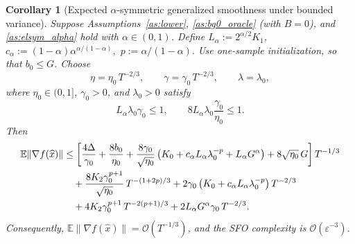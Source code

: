 \documentclass[letter,11pt]{article}
\newtheorem{corollary}{Corollary}[theorem]
\newcommand{\E}{\mathbb{E}}
\newcommand{\Ocal}{\mathcal{O}}
\begin{document}
\begin{corollary}[Expected $\alpha$-symmetric generalized smoothness under bounded variance]
\label{cor:app_nstorm_alpha_bv}
Suppose Assumptions~\ref{as:lower}, \ref{as:bg0_oracle} (with $B=0$), and
\ref{as:elsym_alpha} hold with $\alpha\in(0,1)$. Define
$L_\alpha:=2^{\alpha/2}K_1$, $c_\alpha:=(1-\alpha)\alpha^{\alpha/(1-\alpha)},$ $p:=\alpha/(1-\alpha).$
Use one-sample initialization, so that $b_0\le G$. Choose
\[
    \eta = \eta_0\,T^{-2/3},
    \qquad
    \gamma = \gamma_0\,T^{-2/3},
    \qquad
    \lambda = \lambda_0,
\]
where $\eta_0\in(0,1]$, $\gamma_0>0$, and $\lambda_0>0$ satisfy
\[
    L_\alpha\lambda_0\gamma_0\le1,
    \qquad
    8L_\alpha\lambda_0\frac{\gamma_0}{\eta_0}\le1.
\]
Then
\begin{align}
    \E\|\nabla f(\widehat x)\|
    &\le
    \left[
        \frac{4\Delta}{\gamma_0}
        + \frac{8b_0}{\eta_0}
        + \frac{8\gamma_0}{\sqrt{\eta_0}}
        \left(
            K_0 + c_\alpha L_\alpha\lambda_0^{-p} + L_\alpha G^\alpha
        \right)
        + 8\sqrt{\eta_0}\,G
    \right] T^{-1/3}
    \notag\\
    &\quad
    + \frac{8K_2\gamma_0^{p+1}}{\sqrt{\eta_0}}\,T^{-(1+2p)/3}
    + 2\gamma_0
    \left(
        K_0 + c_\alpha L_\alpha\lambda_0^{-p}
    \right) T^{-2/3}
    \notag\\
    &\quad
    + 4K_2\gamma_0^{p+1}\,T^{-2(p+1)/3}
    + 2L_\alpha G^\alpha\gamma_0\,T^{-2/3}.
    \label{eq:app_nstorm_alpha_bv_final}
\end{align}
Consequently,
$\E\|\nabla f(\widehat x)\| = \Ocal(T^{-1/3})$,
and the SFO complexity is $\Ocal(\varepsilon^{-3})$.
\end{corollary}
\end{document}
